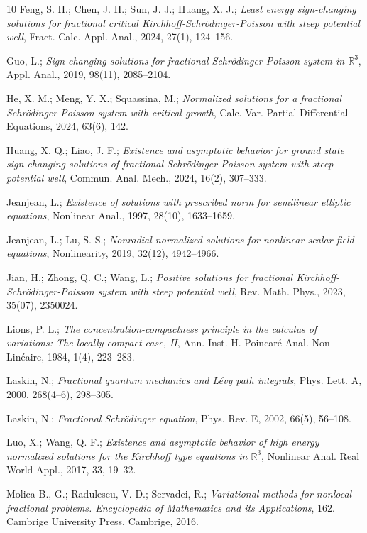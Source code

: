 \begin{thebibliography}{10}
  Feng, S. H.;  Chen, J. H.; Sun, J. J.; Huang, X. J.;
\emph{Least energy sign-changing solutions for fractional critical 
Kirchhoff-Schr\"odinger-Poisson with steep potential well},
 Fract. Calc. Appl. Anal., 2024, 27(1), 124--156.

  Guo, L.;
\emph{Sign-changing solutions for fractional Schr\"odinger-Poisson system in
 $\mathbb{R}^3$}, Appl. Anal., 2019, 98(11), 2085--2104.

 He, X. M.; Meng, Y. X.; Squassina, M.;
\emph{Normalized solutions for a fractional Schr\"odinger-Poisson system with 
critical growth}, Calc. Var. Partial Differential Equations, 2024,  63(6), 142.

 Huang, X. Q.; Liao, J. F.;
\emph{Existence and asymptotic behavior for ground state sign-changing solutions 
of fractional Schr\"odinger-Poisson system with steep potential well},
Commun. Anal. Mech., 2024, 16(2), 307--333.

  Jeanjean, L.;
\emph{Existence of solutions with prescribed norm for semilinear elliptic equations},
Nonlinear Anal., 1997,  28(10), 1633--1659.

 Jeanjean, L.; Lu, S. S.;
\emph{Nonradial normalized solutions for nonlinear scalar field equations},
Nonlinearity, 2019, 32(12), 4942--4966.

  Jian, H.; Zhong, Q. C.; Wang, L.;
\emph{Positive solutions for fractional Kirchhoff-Schr\"odinger-Poisson system with 
steep potential well},  Rev. Math. Phys.,  2023, 35(07), 2350024.

 Lions, P. L.;
\emph{The concentration-compactness principle in the calculus of variations:
The locally compact case, II},
Ann. Inst. H. Poincar\'e Anal. Non Lin\'eaire, 1984,  1(4), 223--283.

   Laskin, N.;
\emph{Fractional quantum mechanics and L\'evy path integrals},
Phys. Lett. A, 2000,  268(4--6), 298--305.

  Laskin, N.;
\emph{Fractional Schr\"odinger equation}, Phys. Rev. E, 2002, 66(5), 56--108.

  Luo, X.;  Wang, Q. F.;
\emph{Existence and asymptotic behavior of high energy normalized solutions for 
the Kirchhoff type equations in $\mathbb{R}^3$},
 Nonlinear Anal. Real World Appl., 2017, 33, 19--32.

  Molica B., G.; Radulescu, V. D.; Servadei, R.;
\emph{Variational methods for nonlocal fractional problems. Encyclopedia of 
Mathematics and its Applications}, 162. Cambrige University Press, Cambrige, 2016.


\end{thebibliography}
